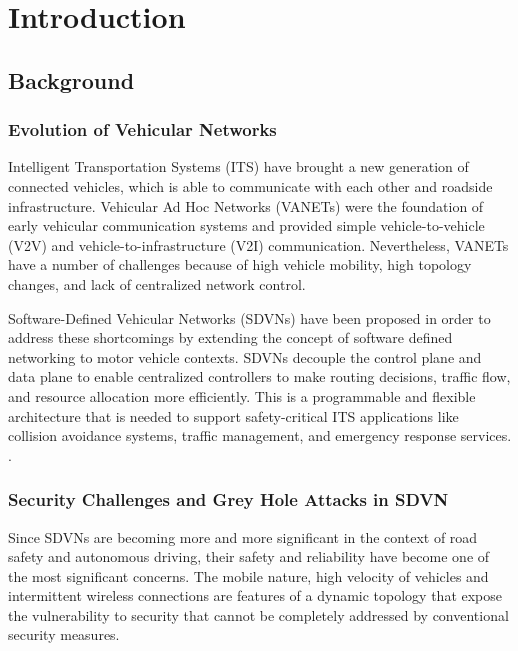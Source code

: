 \documentclass[12pt, a4paper]{report}
\newcommand{\mypar}{\vspace{0.8em}\noindent}
\begin{document}
\renewcommand{\thepage}{\arabic{page}} %
\setcounter{page}{1} %

\chapter{Introduction}
\section{Background}

\subsection{Evolution of Vehicular Networks}
Intelligent Transportation Systems (ITS) have brought a new generation of connected vehicles, which is able to communicate with each other and roadside infrastructure. Vehicular Ad Hoc Networks (VANETs) were the foundation of early vehicular communication systems and provided simple vehicle-to-vehicle (V2V) and vehicle-to-infrastructure (V2I) communication. Nevertheless, VANETs have a number of challenges because of high vehicle mobility, high topology changes, and lack of centralized network control.

\mypar
Software-Defined Vehicular Networks (SDVNs) have been proposed in order to address these shortcomings by extending the concept of software defined networking to motor vehicle contexts. SDVNs decouple the control plane and data plane to enable centralized controllers to make routing decisions, traffic flow, and resource allocation more efficiently. This is a programmable and flexible architecture that is needed to support safety-critical ITS applications like collision avoidance systems, traffic management, and emergency response services. \cite{ieee10402120, islam2021sdvn}.


\subsection{Security Challenges and Grey Hole Attacks in SDVN}

Since SDVNs are becoming more and more significant in the context of road safety and autonomous driving, their safety and reliability have become one of the most significant concerns. The mobile nature, high velocity of vehicles and intermittent wireless connections are features of a dynamic topology that expose the vulnerability to security that cannot be completely addressed by conventional security measures.
\end{document}
